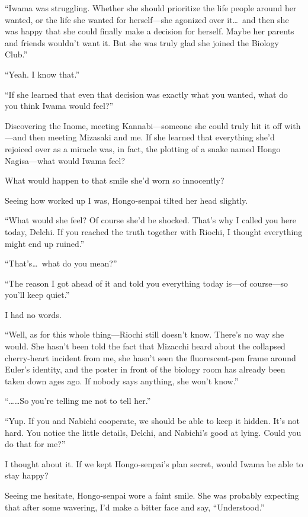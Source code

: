 \documentclass[
    a4paper,
    12pt,
    twoside,
    openany,
    UTF8,
    fontset=windows
]{ctexbook}
\begin{document}
``Iwama was struggling. Whether she should prioritize the life people around her wanted, or the life she wanted for herself---she agonized over it\dots\ and then she was happy that she could finally make a decision for herself. Maybe her parents and friends wouldn't want it. But she was truly glad she joined the Biology Club.''

``Yeah. I know that.''

``If she learned that even that decision was exactly what you wanted, what do you think Iwama would feel?''

Discovering the Inome, meeting Kannabi---someone she could truly hit it off with---and then meeting Mizasaki and me. If she learned that everything she'd rejoiced over as a miracle was, in fact, the plotting of a snake named Hongo Nagisa---what would Iwama feel?

What would happen to that smile she'd worn so innocently?

Seeing how worked up I was, Hongo-senpai tilted her head slightly.

``What would she feel? Of course she'd be shocked. That's why I called you here today, Delchi. If you reached the truth together with Riochi, I thought everything might end up ruined.''

``That's\dots\ what do you mean?''

``The reason I got ahead of it and told you everything today is---of course---so you'll keep quiet.''

I had no words.

``Well, as for this whole thing---Riochi still doesn't know. There's no way she would. She hasn't been told the fact that Mizacchi heard about the collapsed cherry-heart incident from me, she hasn't seen the fluorescent-pen frame around Euler's identity, and the poster in front of the biology room has already been taken down ages ago. If nobody says anything, she won't know.''

``\dots\dots So you're telling me not to tell her.''

``Yup. If you and Nabichi cooperate, we should be able to keep it hidden. It's not hard. You notice the little details, Delchi, and Nabichi's good at lying. Could you do that for me?''

I thought about it. If we kept Hongo-senpai's plan secret, would Iwama be able to stay happy?

Seeing me hesitate, Hongo-senpai wore a faint smile. She was probably expecting that after some wavering, I'd make a bitter face and say, ``Understood.''
\end{document}
